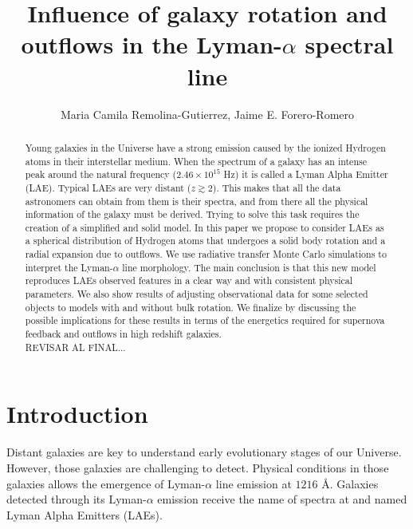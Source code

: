 \documentclass[twocolappendix]{latex/emulateapj}
\begin{document}
\title{Influence of galaxy rotation and outflows in the Lyman-$\alpha$
  spectral line}


\author{Maria Camila Remolina-Gutierrez, Jaime E. Forero-Romero} 


\begin{abstract}
\noindent Young galaxies in the Universe have a strong \lya emission
caused by the ionized Hydrogen atoms in their interstellar
medium. When the spectrum of a galaxy has an intense peak around the
\lya natural frequency ($2.46\times 10^{15}$ Hz) it is called a Lyman
Alpha Emitter (LAE). Typical LAEs are very distant ($z \gtrsim
2$). This makes that all the data astronomers can obtain from them is
their spectra, and from there all the physical information of the
galaxy must be derived. Trying to solve this task requires the
creation of a simplified and solid model. In this paper we propose to
consider LAEs as a spherical distribution of Hydrogen atoms that
undergoes a solid body rotation and a radial expansion due to
outflows. We use radiative transfer Monte Carlo simulations to
interpret the Lyman-$\alpha$ line morphology. The main conclusion is
that this new model reproduces LAEs observed features in a clear way
and with consistent physical parameters. We also show results of
adjusting observational data for some selected objects to models with
and without bulk rotation. We finalize by discussing the possible
implications for these results in terms of the energetics required for
supernova feedback and outflows in high redshift galaxies. \\ 

REVISAR AL FINAL...\\
\end{abstract}

\section{Introduction}
\label{sec:intro}

Distant galaxies are key to understand early evolutionary stages of
our Universe.
However, those galaxies are challenging to detect.
Physical conditions in those galaxies allows the emergence of
Lyman-$\alpha$ line emission at $1216$ \AA \cite{PartrigePeebles}.
Galaxies detected through its Lyman-$\alpha$ emission receive the name of
spectra at  and named Lyman Alpha Emitters (LAEs).
\end{document}
